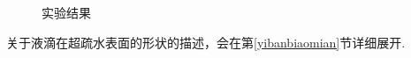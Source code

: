 \documentclass[a4paper,12pt]{article}%
\begin{document}
\begin{figure}[H]
    \centering
    \quad
    \caption{实验结果}\label{水滴接触角图}
\end{figure}

关于液滴在超疏水表面的形状的描述，会在第\ref{yibanbiaomian}节详细展开. 
\end{document}

